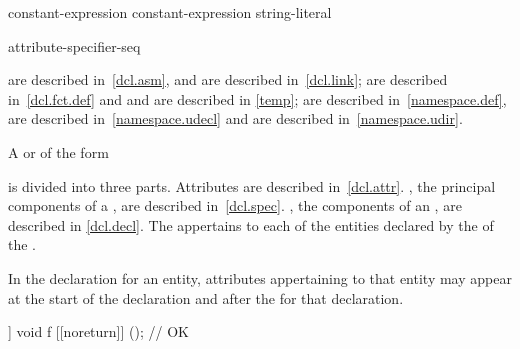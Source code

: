 \begin{bnf}
\br
   \terminal{(} constant-expression \terminal{)} \terminal{;}\br
   \terminal{(} constant-expression \terminal{,} string-literal \terminal{)} \terminal{;}
\end{bnf}

\begin{bnf}
\br
    \terminal{;}
\end{bnf}

\begin{bnf}
\br
    attribute-specifier-seq \terminal{;}
\end{bnf}

\begin{note}
 are described in~\ref{dcl.asm}, and
 are described in~\ref{dcl.link};
 are described in~\ref{dcl.fct.def} and
 and
 are described in \ref{temp};
 are described in~\ref{namespace.def},
 are described in~\ref{namespace.udecl} and
 are described in~\ref{namespace.udir}.
\end{note}

\pnum
A
 or
 of the form
\begin{ncsimplebnf}
   \terminal{;}
\end{ncsimplebnf}
is divided into three parts.
Attributes are described in~\ref{dcl.attr}.
, the principal components of
a , are described in~\ref{dcl.spec}.
, the components of an
, are described in \ref{dcl.decl}.
The 
appertains to each of the entities declared by
the 
of the .
\begin{note}
In the declaration for an entity, attributes appertaining to that
entity may appear at the start of the declaration and after the
 for that declaration.
\end{note}
\begin{example}
\begin{codeblock}
[[noreturn]] void f [[noreturn]] ();    // OK
\end{codeblock}
\end{example}

